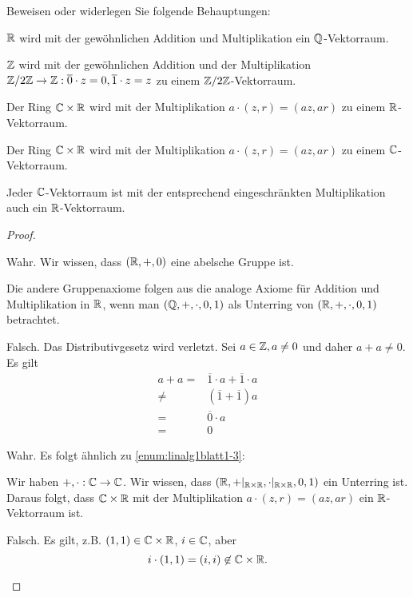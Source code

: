 \begin{Problem}
	Beweisen oder widerlegen Sie folgende Behauptungen:
	\begin{parts}
	\item $\mathbb{R}$ wird mit der gewöhnlichen Addition und Multiplikation ein $\mathbb{Q}$-Vektorraum.
	\item $\mathbb{Z}$ wird mit der gewöhnlichen Addition und der Multiplikation $\mathbb{Z} / 2\mathbb{Z} \to \mathbb{Z}: \overline{0}\cdot z=0,\overline{1}\cdot z=z$ zu einem $\mathbb{Z} / 2\mathbb{Z}$-Vektorraum.
	\item Der Ring $\mathbb{C}\times \mathbb{R}$ wird mit der Multiplikation $a\cdot (z, r)=(az,ar)$ zu einem $\mathbb{R}$-Vektorraum.
	\item Der Ring $\mathbb{C}\times \mathbb{R}$ wird mit der Multiplikation $a\cdot (z, r)=(az, ar)$ zu einem $\mathbb{C}$-Vektorraum.
	\item Jeder $\mathbb{C}$-Vektorraum ist mit der entsprechend eingeschränkten Multiplikation auch ein $\mathbb{R}$-Vektorraum.
	\end{parts}
\end{Problem}
\begin{proof}
	\begin{parts}
	\item \label{enum:linalg1blatt1-3} Wahr. Wir wissen, dass $(\mathbb{R},+,0)$ eine abelsche Gruppe ist. 

		Die andere Gruppenaxiome folgen aus die analoge Axiome f\"{u}r Addition und Multiplikation in $\mathbb{R}$, wenn man $(\mathbb{Q},+,\cdot, 0, 1)$ als Unterring von $(\mathbb{R},+,\cdot, 0, 1)$ betrachtet.
	\item Falsch. Das Distributivgesetz wird verletzt. Sei $a\in \mathbb{Z}, a\neq 0$ und daher $a+a\neq 0$. Es gilt
		\begin{align*}
			a+a=&\overline{1}\cdot a+\overline{1}\cdot a\\
			\neq& (\overline{1}+\overline{1})a\\
			=& \overline{0}\cdot a\\
			=& 0
		\end{align*}
	\item Wahr. Es folgt ähnlich zu \ref{enum:linalg1blatt1-3}:

		Wir haben $+,\cdot:\mathbb{C}\to \mathbb{C}$. Wir wissen, dass  $(\mathbb{R},+|_{\mathbb{R}\times \mathbb{R}}, \cdot|_{\mathbb{R} \times \mathbb{R}}, 0, 1)$ ein Unterring ist. Daraus folgt, dass $\mathbb{C}\times \mathbb{R}$ mit der Multiplikation $a\cdot (z,r)=(az,ar)$ ein $\mathbb{R}$-Vektorraum ist.
	\item Falsch. Es gilt, z.B. $(1,1)\in \mathbb{C}\times \mathbb{R}$, $i\in \mathbb{C}$, aber
		\[
		i\cdot (1,1)=(i,i)\not\in \mathbb{C}\times \mathbb{R}
		.\] 
	\end{parts}
\end{proof}
